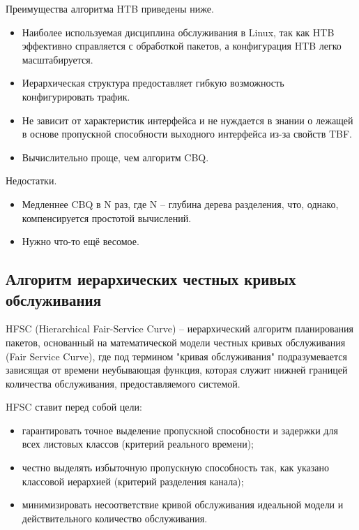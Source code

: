         Преимущества алгоритма HTB приведены ниже.
        \begin{itemize}
            \item Наиболее используемая дисциплина обслуживания в Linux, так как HTB эффективно
				  справляется с обработкой пакетов, а конфигурация HTB легко масштабируется.\cite{lartc}
            \item Иерархическая структура предоставляет гибкую возможность конфигурировать трафик.
            \item Не зависит от характеристик интерфейса и не нуждается в знании о лежащей в
                  основе пропускной способности выходного интерфейса из-за свойств TBF. \cite{tchtb}
            \item Вычислительно проще, чем алгоритм CBQ.\cite{htb}
        \end{itemize}

        Недостатки.
        \begin{itemize}
            \item Медленнее CBQ в N раз, где N -- глубина дерева разделения, что, однако, компенсируется простотой вычислений.\cite{htb}
			\item Нужно что-то ещё весомое.
        \end{itemize}

    \subsection{Алгоритм иерархических честных кривых обслуживания}

        HFSC (Hierarchical Fair-Service Curve) -- иерархический алгоритм планирования пакетов,
        основанный на математической модели честных кривых обслуживания (Fair Service Curve),
        где под термином "кривая обслуживания" подразумевается зависящая от времени
        неубывающая функция, которая служит нижней границей количества обслуживания,
        предоставляемого системой.\cite{hfsc}

        HFSC ставит перед собой цели:
        \begin{itemize}
            \item гарантировать точное выделение пропускной способности и задержки для всех листовых классов (критерий реального времени);
            \item честно выделять избыточную пропускную способность так, как указано классовой иерархией (критерий разделения канала);
            \item минимизировать несоответствие кривой обслуживания идеальной модели и действительного количество обслуживания.\cite{tchfsc}
        \end{itemize}

